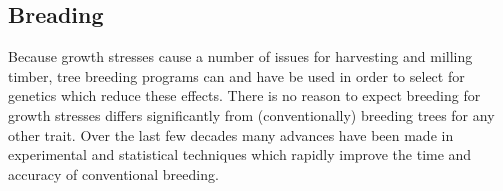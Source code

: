 \subsection{Breading}
Because growth stresses cause a number of issues for harvesting and milling
timber, tree breeding programs can and have be used in order to select for
genetics which reduce these effects. There is no reason to expect  breeding for
growth stresses differs significantly from (conventionally) breeding trees for
any other trait. Over the last few decades many advances have been made in
experimental and statistical techniques which rapidly improve the time and
accuracy of conventional breeding.